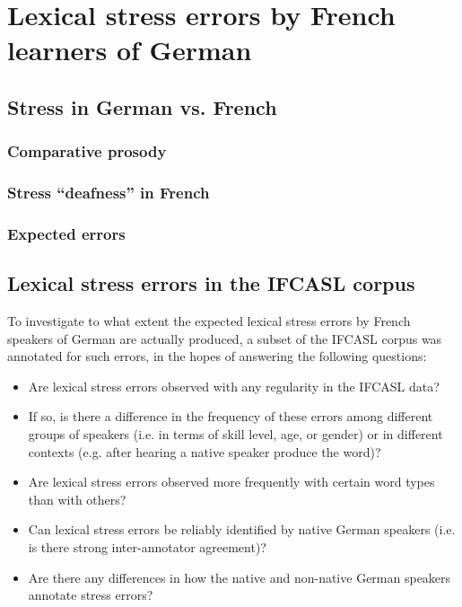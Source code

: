 %
%

\chapter{Lexical stress errors by French learners of German}



\section{Stress in German vs. French }
	\subsection{Comparative prosody}
	\subsection{Stress ``deafness'' in French}
	\subsection{Expected errors}
	
	
	
\section{Lexical stress errors in the IFCASL corpus} 

	To investigate to what extent the expected lexical stress errors by French speakers of German are actually produced, a subset of the IFCASL corpus was annotated for such errors, in the hopes of answering the following questions:

	\begin{itemize}
	\item{Are lexical stress errors observed with any regularity in the IFCASL data?}
	\item{If so, is there a difference in the frequency of these errors among different groups of speakers (i.e. in terms of skill level, age, or gender) or in different contexts (e.g. after hearing a native speaker produce the word)?}
	\item{Are lexical stress errors observed more frequently with certain word types than with others?}
	\item{Can lexical stress errors be reliably identified by native German speakers (i.e. is there strong inter-annotator agreement)?}
	\item{Are there any differences in how the native and non-native German speakers annotate stress errors?}
	\end{itemize}
	
